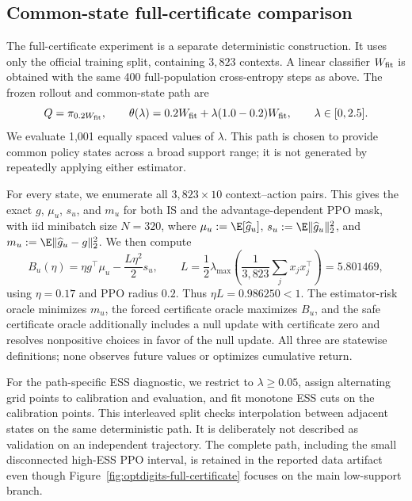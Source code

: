 \subsection{Common-state full-certificate comparison}

The full-certificate experiment is a separate deterministic construction. It
uses only the official training split, containing $3{,}823$ contexts. A linear
classifier $W_{\rm fit}$ is obtained with the same 400 full-population
cross-entropy steps as above. The frozen rollout and common-state path are
\begin{equation}
 Q=\pi_{0.2W_{\rm fit}},
 \qquad
 \theta(\lambda)=0.2W_{\rm fit}
 +\lambda(1.0-0.2)W_{\rm fit},
 \qquad \lambda\in[0,2.5].
 \label{eq:categorical-certificate-path}
\end{equation}
We evaluate 1,001 equally spaced values of $\lambda$. This path is chosen to
provide common policy states across a broad support range; it is not generated
by repeatedly applying either estimator.

For every state, we enumerate all $3{,}823\times10$ context--action pairs. This
gives the exact $g$, $\mu_u$, $s_u$, and $m_u$ for both IS and the
advantage-dependent PPO mask, with iid minibatch size $N=320$, where
$\mu_u:=\E[\widehat g_u]$, $s_u:=\E\|\widehat g_u\|_2^2$, and
$m_u:=\E\|\widehat g_u-g\|_2^2$. We then compute
\begin{equation}
 B_u(\eta)=\eta g^\top\mu_u-\frac{L\eta^2}{2}s_u,
 \qquad
 L=\frac12\lambda_{\max}\left(
 \frac1{3{,}823}\sum_jx_jx_j^\top
 \right)=5.801469,
 \label{eq:categorical-exact-full-certificate}
\end{equation}
using $\eta=0.17$ and PPO radius $0.2$. Thus $\eta L=0.986250<1$.
The estimator-risk oracle minimizes $m_u$, the forced certificate oracle
maximizes $B_u$, and the safe certificate oracle additionally includes a null
update with certificate zero and resolves nonpositive choices in favor of the
null update. All three are statewise definitions; none observes future values
or optimizes cumulative return.

For the path-specific ESS diagnostic, we restrict to $\lambda\ge0.05$, assign
alternating grid points to calibration and evaluation, and fit monotone ESS
cuts on the calibration points. This interleaved split checks interpolation
between adjacent states on the same deterministic path. It is deliberately not
described as validation on an independent trajectory. The complete path,
including the small disconnected high-ESS PPO interval, is retained in the
reported data artifact even though Figure~\ref{fig:optdigits-full-certificate}
focuses on the main low-support branch.

